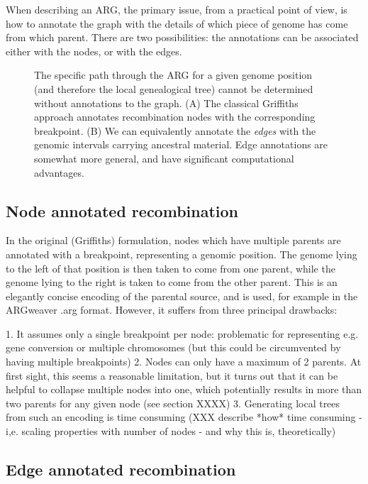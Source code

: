 \documentclass{article}
\begin{document}
When describing an ARG, the primary issue, from a practical point of view, is
how to annotate the graph with the details of which piece of genome has come
from which parent. There are two possibilities: the annotations can be
associated either with the nodes, or with the edges.

\begin{figure}
\vspace{5em}
\caption{\label{fig-arg-annotations}
The specific path through the ARG for a given genome position (and therefore
the local genealogical tree) cannot be determined without annotations
to the graph. (A) The classical Griffiths approach annotates recombination
nodes with the corresponding breakpoint. (B) We can equivalently
annotate the \emph{edges} with the genomic intervals carrying ancestral
material. Edge annotations are somewhat more general, and have
significant computational advantages.}
\end{figure}

\subsection*{Node annotated recombination}

In the original (Griffiths) formulation, nodes which have multiple parents are
annotated with a breakpoint, representing a genomic position. The genome
lying to the left of that position is then taken to come from one parent, while
the genome lying to the right is taken to come from the other parent. This is
an elegantly concise encoding of the parental source, and is used, for example
in the ARGweaver .arg format. However, it suffers from three principal
drawbacks:


1. It assumes only a single breakpoint per node: problematic for representing
e.g. gene conversion or multiple chromosomes (but this could be circumvented by
having multiple breakpoints)
2. Nodes can only have a maximum of 2 parents. At
first sight, this seems a reasonable limitation, but it turns out that it can
be helpful to collapse multiple nodes into one, which potentially results in
more than two parents for any given node (see section XXXX)
3. Generating local
trees from such an encoding is time consuming (XXX describe *how* time
consuming - i,e. scaling properties with number of nodes - and why this is,
theoretically)

\subsection*{Edge annotated recombination}
\end{document}
